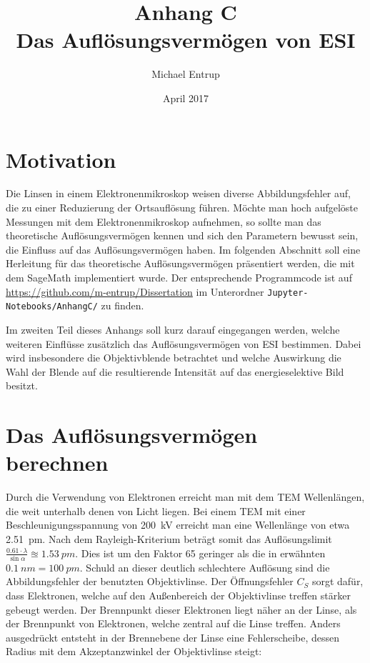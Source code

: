 \documentclass[
	paper=a4,				%
	twoside=true,			%
	BCOR=6mm,				%
	fontsize=12pt,			%
	pagesize=auto,			%
	numbers=noenddot,		%
	bibliography=totoc,		%
	draft=false
]{scrartcl}
\begin{document}
	

\author{Michael Entrup}
\title{Anhang C \\ Das Auflösungsvermögen von ESI}
\date{April 2017}

\maketitle

\tableofcontents

\section{Motivation}

Die Linsen in einem Elektronenmikroskop weisen diverse Abbildungsfehler auf, die zu einer Reduzierung der Ortsauflösung führen. Möchte man hoch aufgelöste Messungen mit dem Elektronenmikroskop aufnehmen, so sollte man das theoretische Auflösungsvermögen kennen und sich den Parametern bewusst sein, die Einfluss auf das Auflösungsvermögen haben. Im folgenden Abschnitt soll eine Herleitung für das theoretische Auflösungsvermögen präsentiert werden, die mit dem SageMath implementiert wurde. Der entsprechende Programmcode ist auf \url{https://github.com/m-entrup/Dissertation} im Unterordner \texttt{Jupyter-Notebooks/AnhangC/} zu finden.

Im zweiten Teil dieses Anhangs soll kurz darauf eingegangen werden, welche weiteren Einflüsse zusätzlich das Auflösungsvermögen von ESI bestimmen. Dabei wird insbesondere die Objektivblende betrachtet und welche Auswirkung die Wahl der Blende auf die resultierende Intensität auf das energieselektive Bild besitzt.

\clearpage

\section{Das Auflösungsvermögen berechnen}

Durch die Verwendung von Elektronen erreicht man mit dem TEM Wellenlängen, die weit unterhalb denen von Licht liegen. Bei einem TEM mit einer Beschleunigungsspannung von \SI{200}{kV} erreicht man eine Wellenlänge von etwa \SI{2,51}{pm}. Nach dem Rayleigh-Kriterium beträgt somit das Auflösungslimit $\frac{\num{0,61}\cdot\lambda}{\sin\alpha}\approxeq\SI{1,53}{pm}$. Dies ist um den Faktor 65 geringer als die in \cite{tanaka_present_2008} erwähnten $\SI{0,1}{nm}=\SI{100}{pm}$. Schuld an dieser deutlich schlechtere Auflösung sind die Abbildungsfehler der benutzten Objektivlinse. Der Öffnungsfehler $C_S$ sorgt dafür, dass Elektronen, welche auf den Außenbereich der Objektivlinse treffen stärker gebeugt werden. Der Brennpunkt dieser Elektronen liegt näher an der Linse, als der Brennpunkt von Elektronen, welche zentral auf die Linse treffen. Anders ausgedrückt entsteht in der Brennebene der Linse eine Fehlerscheibe, dessen Radius mit dem Akzeptanzwinkel der Objektivlinse steigt:
\end{document}
